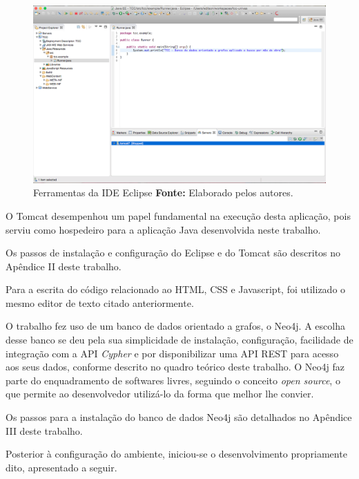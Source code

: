 \begin{figure}[h!]
	\centerline{\includegraphics[scale=0.3]{./imagens/eclipse-editor-texto.png}}
	\caption[Ferramentas da IDE Eclipse]
	{Ferramentas da IDE Eclipse \textbf{Fonte:} Elaborado pelos autores.}
	\label{fig:ide_eclipse}
\end{figure}

\par O Tomcat desempenhou um papel fundamental na execução desta aplicação, pois serviu como hospedeiro para a aplicação Java desenvolvida neste trabalho. 

\par Os passos de instalação e configuração do Eclipse e do Tomcat são descritos no Apêndice II deste trabalho.

\par Para a escrita do código relacionado ao HTML, CSS e Javascript, foi utilizado o mesmo editor de texto citado anteriormente.

\par O trabalho fez uso de um banco de dados orientado a grafos, o Neo4j. A escolha desse banco se deu pela sua simplicidade de instalação, configuração, facilidade de integração com a API \textit{Cypher} e por disponibilizar uma API REST para acesso aos seus dados, conforme descrito no quadro teórico deste trabalho. O Neo4j faz parte do enquadramento de softwares livres, seguindo o conceito \textit{open source}, o que permite ao desenvolvedor utilizá-lo da forma que melhor lhe convier. 

\par Os passos para a instalação do banco de dados Neo4j são detalhados no Apêndice III deste trabalho.

\par Posterior à configuração do ambiente, iniciou-se o desenvolvimento propriamente dito, apresentado a seguir.

